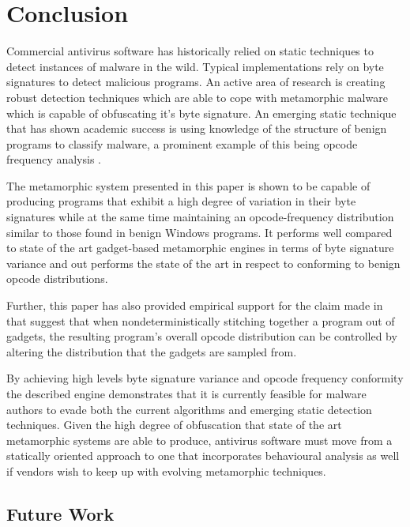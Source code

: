 \chapter{Conclusion}

    Commercial antivirus software has historically relied on static techniques
    to detect instances of malware in the wild. Typical implementations rely on
    byte signatures to detect malicious programs. An active area of research is
    creating robust detection techniques which are able to cope with metamorphic
    malware which is capable of obfuscating it's byte signature. An emerging
    static technique that has shown academic success is using knowledge of the
    structure of benign programs to classify malware, a prominent example of
    this being opcode frequency analysis \cite{chisquared}.

    The metamorphic system presented in this paper is shown to be capable of
    producing programs that exhibit a high degree of variation in their
    byte signatures while at the same time maintaining an opcode-frequency
    distribution similar to those found in benign Windows programs. It performs
    well compared to state of the art gadget-based metamorphic engines in terms
    of byte signature variance and out performs the state of the art in respect
    to conforming to benign opcode distributions.

    Further, this paper has also provided empirical support for the claim made
    in \cite{franken} that suggest that when nondeterministically stitching
    together a program out of gadgets, the resulting program's overall opcode
    distribution can be controlled by altering the distribution that the gadgets
    are sampled from.

    By achieving high levels byte signature variance and opcode frequency
    conformity the described engine demonstrates that it is currently feasible
    for malware authors to evade both the current algorithms and emerging static
    detection techniques. Given the high degree of obfuscation that state of the
    art metamorphic systems are able to produce, antivirus software must move
    from a statically oriented approach to one that incorporates behavioural
    analysis as well if vendors wish to keep up with evolving metamorphic
    techniques.

    \section{Future Work}

